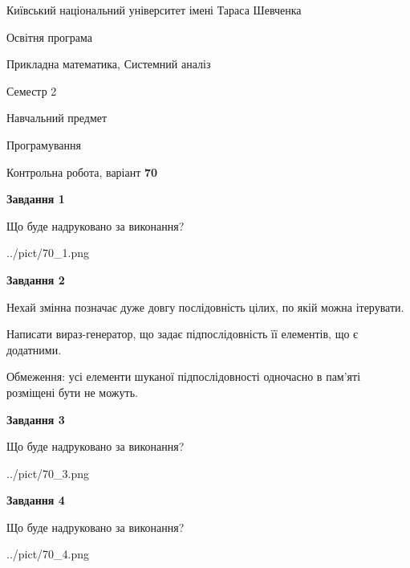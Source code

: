 \documentclass[12pt, ukrainian]{article}
\begin{document}
{{\begin {small}\par
{ \center  Київський національний університет імені Тараса Шевченка \par}
{\parbox {5 cm}{Освітня програма \hfill}{\parbox {8 cm}{Прикладна математика, Системний аналіз \hfill}}\parbox {5 cm}{\hfill Семестр 2}}\par
{\parbox {5 cm} {Навчальний предмет \hfill}\parbox {7 cm}{Програмування \hfill}\parbox {6cm}{\hfill}\par}\vspace{-7pt} \end{small}}{\center Контрольна робота, варіант  \No \textbf
{ 70 }\par}}
{
\begin {large}
{\begin {center}\textbf{Завдання 1}\end {center}}\par
Що буде надруковано за виконання?\par\par
\begin{center}
	{../pict/70_1.png}
\end{center}
\newpage

{\begin {center}\textbf{Завдання 2}\end {center}}\par
Нехай змінна  позначає дуже довгу послідовність цілих, по якій можна ітерувати.

Написати вираз-генератор, що задає підпослідовність її елементів, що є додатни\-ми.

Обмеження: усі елементи шуканої підпослідовності одночасно в пам'яті розміщені бути не можуть.\par
\newpage

{\begin {center}\textbf{Завдання 3}\end {center}}\par
Що буде надруковано за виконання?\par
\begin{center}
	{../pict/70_3.png}
\end{center}
\newpage

{\begin {center}\textbf{Завдання 4}\end {center}}\par
Що буде надруковано за виконання?\par
\begin{center}
	{../pict/70_4.png}
\end{center}
\newpage


\end{large}}
\end{document}
